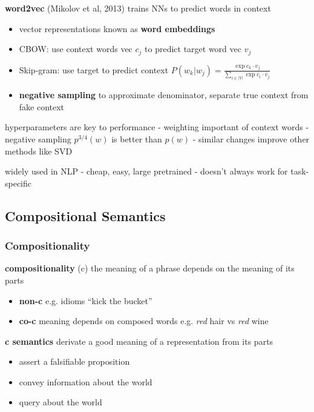 \documentclass[]{article}
\theoremstyle{definition}
\begin{document}
\textbf{word2vec} (Mikolov et al, 2013) trains NNs to predict words in context
\begin{itemize}
    \item vector representations known as \textbf{word embeddings}
    \item CBOW: use context words vec $c_j$ to predict target word vec $v_j$
    \item Skip-gram: use target to predict context $P(w_k | w_j) = \frac{\exp{c_k \cdot v_j}}{\sum_{i \in |V|} \exp{c_i \cdot v_j}}$
    \item \textbf{negative sampling} to approximate denominator, separate true context from fake context
\end{itemize}

hyperparameters are key to performance
- weighting important of context words
- negative sampling $p^{3/4}(w)$ is better than $p(w)$
- similar changes improve other methods like SVD

widely used in NLP
- cheap, easy, large pretrained
- doesn't always work for task-specific

\subsection{Compositional Semantics}%
\label{sub:compositional_semantics}

\subsubsection{Compositionality}%
\label{ssub:compositionality}

\textbf{compositionality} (c) the meaning of a phrase depends on the meaning of its parts
\begin{itemize}
    \item \textbf{non-c} e.g. idioms ``kick the bucket''
    \item \textbf{co-c} meaning depends on composed words e.g. \textit{red} hair vs \textit{red} wine
\end{itemize}

\textbf{c semantics} derivate a good meaning of a representation from its parts
\begin{itemize}
    \item assert a falsifiable proposition
    \item convey information about the world
    \item query about the world
\end{itemize}
\end{document}
